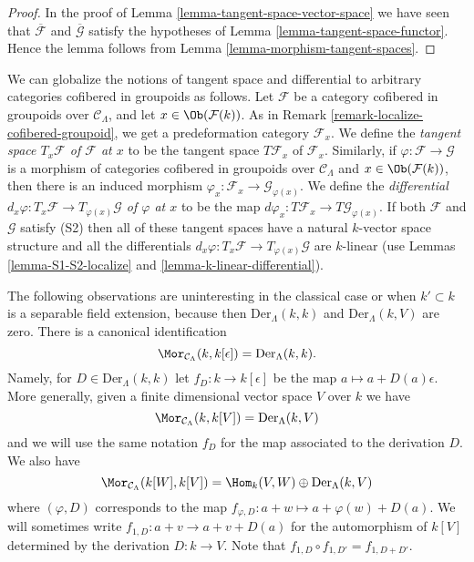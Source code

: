 \begin{proof}
In the proof of
Lemma \ref{lemma-tangent-space-vector-space}
we have seen that $\overline{\mathcal{F}}$ and $\overline{\mathcal{G}}$
satisfy the hypotheses of
Lemma \ref{lemma-tangent-space-functor}.
Hence the lemma follows from
Lemma \ref{lemma-morphism-tangent-spaces}.
\end{proof}

\begin{remark}
\label{remark-tangent-space-cofibered-groupoid}
We can globalize the notions of tangent space and differential to arbitrary
categories cofibered in groupoids as follows. Let $\mathcal{F}$ be a category
cofibered in groupoids over $\mathcal{C}_\Lambda$, and let
$x \in \Ob(\mathcal{F}(k))$. As in
Remark \ref{remark-localize-cofibered-groupoid},
we get a predeformation category $\mathcal{F}_x$. We define the
{\it tangent space $T_x \mathcal{F}$ of $\mathcal{F}$ at $x$}
to be the tangent space $T \mathcal{F}_x$ of
$\mathcal{F}_x$. Similarly, if
$\varphi : \mathcal{F} \to \mathcal{G}$ is a morphism of categories cofibered
in groupoids over $\mathcal{C}_\Lambda$ and $x \in \Ob(\mathcal{F}(k))$,
then there is an induced morphism
$\varphi_x: \mathcal{F}_x \to \mathcal{G}_{\varphi(x)}$. We define the
{\it differential
$d_x \varphi : T_x \mathcal{F} \to T_{\varphi(x)} \mathcal{G}$
of $\varphi$ at $x$} to be the map
$d \varphi_x: T \mathcal{F}_x \to T \mathcal{G}_{\varphi(x)}$.
If both $\mathcal{F}$ and $\mathcal{G}$ satisfy (S2) then
all of these tangent spaces have a natural $k$-vector space structure
and all the differentials
$d_x \varphi : T_x \mathcal{F} \to T_{\varphi(x)} \mathcal{G}$
are $k$-linear (use
Lemmas \ref{lemma-S1-S2-localize} and \ref{lemma-k-linear-differential}).
\end{remark}

\noindent
The following observations are uninteresting in the classical case or when
$k' \subset k$ is a separable field extension, because then
$\text{Der}_\Lambda(k, k)$ and $\text{Der}_\Lambda(k, V)$ are zero.
There is a canonical identification
$$
\Mor_{\mathcal{C}_\Lambda}(k, k[\epsilon]) =
\text{Der}_\Lambda(k, k).
$$
Namely, for $D \in \text{Der}_\Lambda(k, k)$ let $f_D : k \to k[\epsilon]$
be the map $a \mapsto a + D(a)\epsilon$. More generally, given a finite
dimensional vector space $V$ over $k$ we have
$$
\Mor_{\mathcal{C}_\Lambda}(k, k[V]) =
\text{Der}_\Lambda(k, V)
$$
and we will use the same notation $f_D$ for the map associated to the
derivation $D$. We also have
$$
\Mor_{\mathcal{C}_\Lambda}(k[W], k[V]) =
\Hom_k(V, W) \oplus \text{Der}_\Lambda(k, V)
$$
where $(\varphi, D)$ corresponds to the map
$f_{\varphi, D} : a + w \mapsto a + \varphi(w) + D(a)$. We will sometimes write
$f_{1, D} : a + v \to a + v + D(a)$ for the automorphism
of $k[V]$ determined by the derivation $D : k \to V$. Note that
$f_{1, D} \circ f_{1, D'} = f_{1, D + D'}$.

